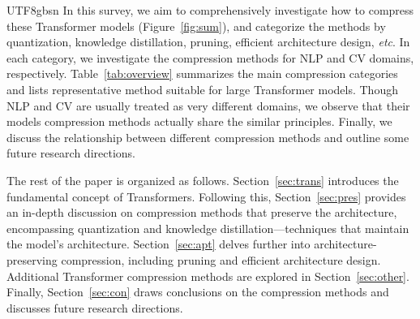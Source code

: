 \documentclass[10pt,journal,compsoc]{IEEEtran}
\newcommand{\etc}{\emph{etc}}
\newcommand{\<}{\left\langle}
\renewcommand{\>}{\right\rangle}
\newcommand{\1}{\mathbbm{1}}
\begin{document}
\begin{CJK}{UTF8}{gbsn}
In this survey, we aim to comprehensively investigate how to compress these  Transformer models (Figure~\ref{fig:sum}), and categorize the methods by  quantization, knowledge distillation, pruning, efficient architecture design, \etc. In each category, we investigate the  compression methods for NLP and CV domains, respectively. Table~\ref{tab:overview} summarizes the main compression categories and lists representative method suitable for large Transformer models. Though NLP and CV are usually treated as very different domains,  we observe that their models compression methods actually share the similar principles. Finally, we discuss the relationship between different compression methods and outline some future research directions.


The rest of the paper is organized as follows. Section~\ref{sec:trans} introduces the fundamental concept of Transformers. Following this, Section~\ref{sec:pres} provides an in-depth discussion on compression methods that preserve the architecture, encompassing quantization and knowledge distillation—techniques that maintain the model's  architecture. Section~\ref{sec:apt} delves further into architecture-preserving compression, including pruning and efficient architecture design. Additional Transformer compression methods are explored in Section~\ref{sec:other}. Finally, Section~\ref{sec:con} draws conclusions on the compression methods and discusses future research directions.



\end{CJK}
\end{document}

